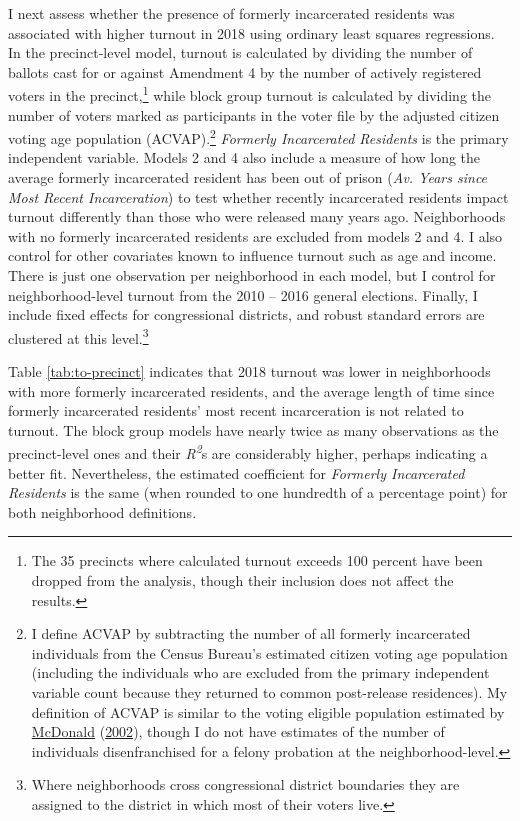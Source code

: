 \documentclass[
  12pt,
]{article}
\begin{document}
I next assess whether the presence of formerly incarcerated residents was associated with higher turnout in 2018 using ordinary least squares regressions. In the precinct-level model, turnout is calculated by dividing the number of ballots cast for or against Amendment 4 by the number of actively registered voters in the precinct,\footnote{The 35 precincts where calculated turnout exceeds 100 percent have been dropped from the analysis, though their inclusion does not affect the results.} while block group turnout is calculated by dividing the number of voters marked as participants in the voter file by the adjusted citizen voting age population (ACVAP).\footnote{I define ACVAP by subtracting the number of all formerly incarcerated individuals from the Census Bureau's estimated citizen voting age population (including the individuals who are excluded from the primary independent variable count because they returned to common post-release residences). My definition of ACVAP is similar to the voting eligible population estimated by \protect\hyperlink{ref-McDonald2002}{McDonald} (\protect\hyperlink{ref-McDonald2002}{2002}), though I do not have estimates of the number of individuals disenfranchised for a felony probation at the neighborhood-level.} \emph{Formerly Incarcerated Residents} is the primary independent variable. Models 2 and 4 also include a measure of how long the average formerly incarcerated resident has been out of prison (\emph{Av. Years since Most Recent Incarceration}) to test whether recently incarcerated residents impact turnout differently than those who were released many years ago. Neighborhoods with no formerly incarcerated residents are excluded from models 2 and 4. I also control for other covariates known to influence turnout such as age and income. There is just one observation per neighborhood in each model, but I control for neighborhood-level turnout from the 2010 -- 2016 general elections. Finally, I include fixed effects for congressional districts, and robust standard errors are clustered at this level.\footnote{Where neighborhoods cross congressional district boundaries they are assigned to the district in which most of their voters live.}

\begin{singlespace}


\end{singlespace}

Table \ref{tab:to-precinct} indicates that 2018 turnout was lower in neighborhoods with more formerly incarcerated residents, and the average length of time since formerly incarcerated residents' most recent incarceration is not related to turnout. The block group models have nearly twice as many observations as the precinct-level ones and their \emph{R\textsuperscript{2}}s are considerably higher, perhaps indicating a better fit. Nevertheless, the estimated coefficient for \emph{Formerly Incarcerated Residents} is the same (when rounded to one hundredth of a percentage point) for both neighborhood definitions.
\end{document}
